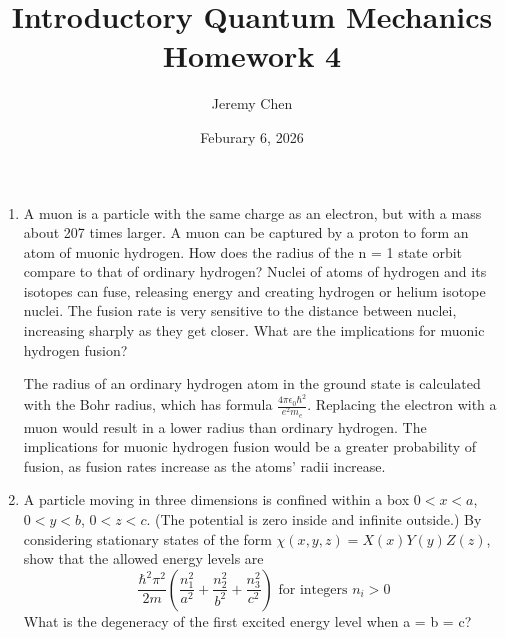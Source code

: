 \documentclass[10pt,letterpaper]{article}
\title{Introductory Quantum Mechanics Homework 4}
\author{Jeremy Chen}
\date{Feburary 6, 2026}
\begin{document}
	\maketitle

\begin{enumerate}

\item A muon is a particle with the same charge as an electron, but with a mass about 207 times larger. A muon can be captured by a proton to form an atom of muonic hydrogen. How does the radius of the n = 1 state orbit compare to that of ordinary hydrogen? Nuclei of atoms of hydrogen and its isotopes can fuse, releasing energy and creating hydrogen or helium isotope nuclei. The fusion rate is very sensitive to the distance between nuclei, increasing sharply as they get closer. What are the implications for muonic hydrogen fusion?

\color{violet}
The radius of an ordinary hydrogen atom in the ground state is calculated with the Bohr radius, which has formula $\frac{4\pi\epsilon_{0}\hbar^{2}}{e^{2}m_{e}}$. Replacing the electron with a muon would result in a lower radius than ordinary hydrogen. The implications for muonic hydrogen fusion would be a greater probability of fusion, as fusion rates increase as the atoms' radii increase.
\color{black}

\item A particle moving in three dimensions is confined within a box $0 < x < a$, $0 < y < b$, $0 < z < c$. (The potential is zero inside and infinite outside.) By considering stationary states of the form $\chi(x, y, z) = X(x)Y(y)Z(z)$, show that the allowed energy levels are 
$$\frac{\hbar^{2}\pi^{2}}{2m}\left( \frac{n_{1}^{2}}{a^{2}} + \frac{n_{2}^{2}}{b^{2}} + \frac{n_{3}^{2}}{c^{2}} \right) \text{    for integers }n_{i} > 0$$
What is the degeneracy of the first excited energy level when a = b = c?


\end{enumerate}
\end{document}
